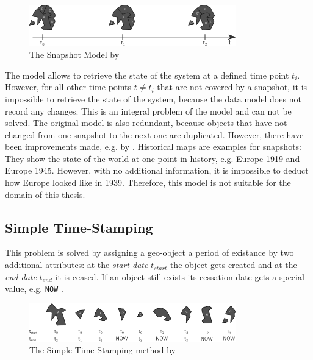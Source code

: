 \begin{figure}[H]
  \centering
  \includegraphics[width=0.8\textwidth]{graphics/basics/stdm/snapshot_model}
  \caption{The Snapshot Model by \cite{Langran1988frameworktgis}}
  \label{fig:snapshot_model}
\end{figure}

The model allows to retrieve the state of the system at a defined time point $t_i$. However, for all other time points $t \neq t_i$ that are not covered by a snapshot, it is impossible to retrieve the state of the system, because the data model does not record any changes. This is an integral problem of the model and can not be solved. The original model is also redundant, because objects that have not changed from one snapshot to the next one are duplicated. However, there have been improvements made, e.g. by \cite{armenakis92}.
Historical maps are examples for snapshots: They show the state of the world at one point in history, e.g. Europe 1919 and Europe 1945. However, with no additional information, it is impossible to deduct how Europe looked like in 1939. Therefore, this model is not suitable for the domain of this thesis.


\subsection{Simple Time-Stamping} %
\label{sub:simple_time_stamping}

This problem is solved by assigning a geo-object a period of existance by two additional attributes: at the \emph{start date} $t_{start}$ the object gets created and at the \emph{end date} $t_{end}$ it is ceased. If an object still exists its cessation date gets a special value, e.g. \texttt{NOW}
\cite{hunter90timestamping}.

\begin{figure}[ht]
  \centering
  \includegraphics[width=0.8\textwidth]{graphics/basics/stdm/simple_time_stamping}
  \caption{The Simple Time-Stamping method by \cite{hunter90timestamping}}
  \label{fig:simple_time_stamping}
\end{figure}

